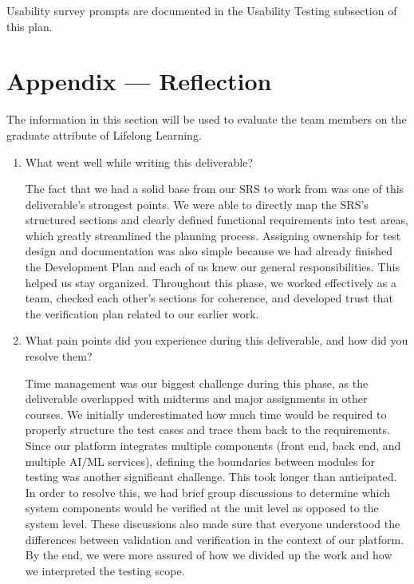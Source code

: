 \documentclass[12pt, titlepage]{article}
\begin{document}
Usability survey prompts are documented in the Usability Testing subsection of this plan.

\newpage{}
\section*{Appendix --- Reflection}

The information in this section will be used to evaluate the team members on the
graduate attribute of Lifelong Learning.



\begin{enumerate}
  \item What went well while writing this deliverable? 
  
  \hspace{2em} The fact that we had a solid base from our SRS to work from was one of this deliverable's strongest points. We were able to directly map the SRS's structured sections and clearly defined functional requirements into test areas, which greatly streamlined the planning process. Assigning ownership for test design and documentation was also simple because we had already finished the Development Plan and each of us knew our general responsibilities. This helped us stay organized. Throughout this phase, we worked effectively as a team, checked each other's sections for coherence, and developed trust that the verification plan related to our earlier work.

  \item What pain points did you experience during this deliverable, and how
    did you resolve them?

  \hspace{2em} Time management was our biggest challenge during this phase, as the deliverable overlapped with midterms and major assignments in other courses. We initially underestimated how much time would be required to properly structure the test cases and trace them back to the requirements. Since our platform integrates multiple components (front end, back end, and multiple AI/ML services), defining the boundaries between modules for testing was another significant challenge. This took longer than anticipated. In order to resolve this, we had brief group discussions to determine which system components would be verified at the unit level as opposed to the system level. These discussions also made sure that everyone understood the differences between validation and verification in the context of our platform. By the end, we were more assured of how we divided up the work and how we interpreted the testing scope.


\end{enumerate}
\end{document}
